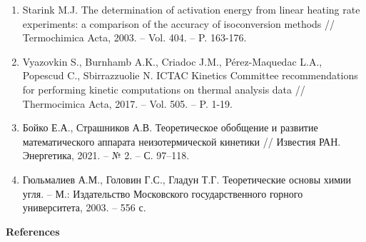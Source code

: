 \begin{enumerate}
\item
Starink M.J. The determination of activation energy from linear
heating rate experiments: a comparison of the accuracy of isoconversion
methods // Termochimica Acta, 2003. -- Vol. 404. -- P. 163-176.

\item
Vyazovkin S., Burnhamb A.K., Criadoc J.M., Pérez-Maquedac L.A.,
Popescud C., Sbirrazzuolie N. ICTAC Kinetics Committee recommendations
for performing kinetic computations on thermal analysis data //
Thermocimica Acta, 2017. -- Vol. 505. -- P. 1-19.

\item
Бойко Е.А., Страшников А.В. Теоретическое обобщение и развитие
математического аппарата неизотермической кинетики // Известия РАН.
Энергетика, 2021. -- № 2. -- С. 97--118.

\item
Гюльмалиев А.М., Головин Г.С., Гладун Т.Г. Теоретические основы
химии угля. -- М.: Издательство Московского государственного горного
университета, 2003. -- 556 с.
\end{enumerate}

{\bfseries References}

